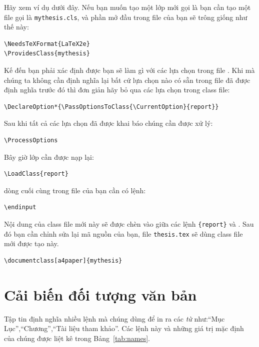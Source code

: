 \documentclass[a4paper]{report}
\begin{document}
Hãy xem ví dụ dưới đây. Nếu bạn muốn tạo một lớp mới gọi là  bạn cần tạo một file gọi là \texttt{mythesis.cls}, và phần mở đầu trong file của bạn sẽ trông giống như thế này:

\begin{verbatim}
\NeedsTeXFormat{LaTeX2e}
\ProvidesClass{mythesis}
\end{verbatim}
Kế đến bạn phải xác định được bạn sẽ làm gì với các lựa chọn trong file . Khi mà chúng ta không cần định nghĩa lại bất cứ lựa chọn nào có sẵn trong file đã được định nghĩa trước đó thì đơn giản hãy bỏ qua các lựa chọn trong  class file:

\begin{verbatim}
\DeclareOption*{\PassOptionsToClass{\CurrentOption}{report}}
\end{verbatim}
Sau khi tất cả các lựa chọn đã được khai báo chúng cần được xử lý:
\begin{verbatim}
\ProcessOptions
\end{verbatim}
Bây giờ lớp  cần được nạp lại:
\begin{verbatim}
\LoadClass{report}
\end{verbatim}
dòng cuối cùng trong file của bạn cần có lệnh:
\begin{verbatim}
\endinput
\end{verbatim}
Nội dung của class file mới này sẽ được chèn vào giữa các lệnh \verb|{report}| và . Sau đó bạn cần chỉnh sửa lại mã nguồn  của bạn, file \texttt{thesis.tex} sẽ dùng class file mới được tạo này.

\begin{verbatim}
\documentclass[a4paper]{mythesis}
\end{verbatim}

\section{Cải biến đối tượng văn bản}

Tập tin   định nghĩa nhiều lệnh mà chúng dùng để in ra các \emph{từ} như:``Mục Lục'',``Chương'',``Tài liệu tham khảo''. Các lệnh này và những giá trị mặc định của chúng được liệt kê trong  Bảng~\ref{tab:names}.
\end{document}
